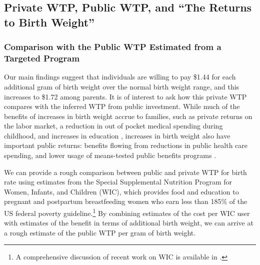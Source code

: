 \documentclass[a4paper, 11pt]{article}
\begin{document}
\begin{spacing}{1.4}
\subsection{Private WTP, Public WTP, and ``The Returns to Birth Weight''}
\label{returnsBW}

\subsubsection{Comparison with the Public WTP Estimated from a Targeted Program}
Our main findings suggest that individuals are willing to pay \$1.44 for each additional gram of birth weight over the normal birth weight range, and this increases to \$1.72 among parents.
It is of interest to ask how this private WTP compares
with the inferred WTP from public investment.  While much of the benefits
of increases in birth weight accrue to families, such as private returns
on the labor market, a reduction in out of pocket medical spending during
childhood, and increases in education \citep{BehrmanRosenzweig2004,
  Oreopoulosetal2008}, increases in birth weight also have
important public returns: benefits flowing from reductions in public health care spending,
and lower usage of means-tested public benefits programs
\citep{Almondetal2005,Bharadwajetal2015}.

We can provide a rough comparison between public and private WTP for
birth rate using estimates from the Special Supplemental Nutrition
Program for Women, Infants, and Children (WIC), which provides food and education to pregnant and postpartum
breastfeeding women who earn less than 185\% of the US federal
poverty guideline.\footnote{ A comprehensive discussion of recent work on
WIC is available in \citet{BitlerKaroly2015}.}  By combining estimates
of the cost per WIC user with estimates of the benefit in terms of
additional birth weight, we can arrive at a rough estimate of the
public WTP per gram of birth weight.


\end{spacing}
\end{document}
